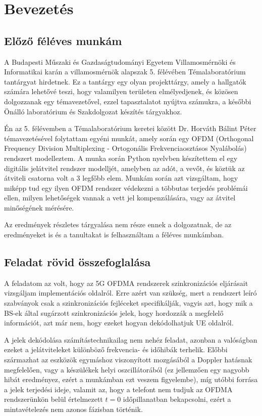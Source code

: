 \chapter{Bevezetés}

\section{Előző féléves munkám}

A Budapesti Műszaki és Gazdaságtudományi Egyetem Villamosmérnöki és Informatikai karán a villamosmérnök alapszak 5. félévében Témalaboratórium tantárgyat hirdetnek.
Ez a tantárgy egy olyan projekttárgy, amely a hallgatók számára lehetővé teszi, hogy valamilyen területen elmélyedjenek, és közösen dolgozzanak egy témavezetővel, ezzel tapasztalatot nyújtva számukra, a későbbi Önálló laboratórium és Szakdolgozat készítés tárgyakhoz.

Én az 5. félévemben a Témalaboratórium keretei között Dr. Horváth Bálint Péter témavezetésével folytattam egyéni munkát, amely során egy OFDM (Orthogonal Frequency Division Multiplexing - Ortogonális Frekvenciaosztásos Nyalábolás) rendszert modelleztem.
A munka során Python nyelvben készítettem el egy digitális jelátvitel rendszer modelljét, amelyben az adót, a vevőt, és köztük az átviteli csatorna volt a 3 legfőbb elem.
Munkám során azt vizsgáltam, hogy miképp tud egy ilyen OFDM rendszer védekezni a többutas terjedés problémái ellen, milyen lehetőségek vannak a vett jel kompenzálására, vagy az átvitel minőségének mérésére.

Az eredmények részletes tárgyalása nem része ennek a dolgozatnak, de az eredményeket is és a tanultakat is felhasználtam a féléves munkámban.

\section{Feladat rövid összefoglalása}

A feladatom az volt, hogy az 5G OFDMA rendszerek szinkronizációs eljárásait vizsgáljam implementációs oldalról. 
Erre azért van szükség, mert a rendszert leíró szabványok csak a szinkronizációs fejléceket specifikálják, vagyis azt, hogy mik a BS-ek által sugárzott szinkronizációs jelek, hogy hordozzák a megfelelő információt, azt már nem, hogy ezeket hogyan dekódolhatjuk UE oldalról.

A jelek dekódolása számítástechnikailag nem nehéz feladat, azonban a valóságban ezeket a jelátviteleket különböző frekvencia- és időhibák terhelik.
Előbbi származhat az eszközök egymáshoz viszonyított mozgásából a Doppler hatásnak megfelelően, vagy a készülékek helyi oszcillátorából (ez jellemzően egy nagyobb hibát eredményez, ezért a munkámban ezt veszem figyelembe), míg utóbbi forrása a jelek terjedési ideje, valamit az, hogy a telefont nem tudjuk az OFDMA rendszerünkön belül értelmezett $ t = 0 $ időpillanatban bekapcsolni, ezért a mintavételezés nem azonos fázisban történik.

